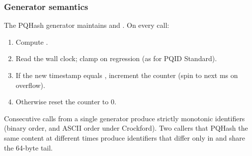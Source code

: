\subsubsection{Generator semantics}

The PQHash generator maintains  and . On every call:
\begin{enumerate}
  \item Compute .
  \item Read the wall clock; clamp on regression (as for PQID Standard).
  \item If the new timestamp equals , increment the counter (spin to next ms on overflow).
  \item Otherwise reset the counter to 0.
\end{enumerate}

Consecutive calls from a single generator produce strictly monotonic identifiers (binary order, and ASCII order under Crockford). Two callers that PQHash the same content at different times produce identifiers that differ only in  and share the 64-byte tail.

